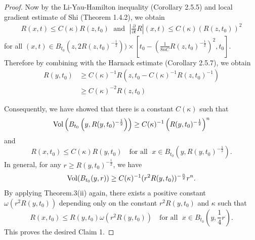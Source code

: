 \begin{proof}
Now by the Li-Yau-Hamilton inequality (Corollary 2.5.5) and local
gradient estimate of Shi (Theorem 1.4.2), we obtain
\begin{align*}
R(x,t)\leq C(\kappa)R(z,t_{0})\; \text{ and }\;
\left|\frac{\partial}{\partial t}R\right|(x,t) \leq
C(\kappa)(R(z,t_{0}))^{2}
\end{align*}
for all $ (x,t)\in
B_{t_{0}}(z,2R(z,t_{0})^{-\frac{1}{2}}))\times[t_{0}-
(\frac{1}{8nC}R(z,t_{0})^{-\frac{1}{2}})^{2},t_{0}]$. Therefore by
combining with the Harnack estimate (Corollary 2.5.7), we obtain
\begin{align*}
R(y,t_{0})&  \geq C(\kappa)^{-1}R(z,t_{0}-C(\kappa)^{-1}R(z,t_{0})^{-1})\\
&  \geq C(\kappa)^{-2} R(z,t_{0})
\end{align*}

Consequently, we have showed that there is a constant $C(\kappa)$
such that
$$
\operatorname{Vol} \left(B_{t_{0}}\left(y,R(y,t_{0})^{-\frac{1}{2}}\right)\right) \geq
C(\kappa)^{-1}\left(R(y,t_{0})^{-\frac{1}{2}}\right)^{n}
$$
and
$$
R(x,t_{0})\leq C(\kappa)R(y,t_{0}) \quad \text{for all }\; x\in
B_{t_{0}}\left(y,R(y,t_{0})^{-\frac{1}{2}}\right).
$$
In general, for any $r\geq R(y,t_{0})^{-\frac{1}{2}}$, we have
$$
\operatorname{Vol} (B_{t_{0}}(y,r)) \geq
C(\kappa)^{-1}(r^{2}R(y,t_{0}))^{-\frac{n}{2}}r^{n}.
$$
By\; applying\; Theorem.3(ii)\; again,\; there\; exists\;
a\; positive\; constant $\omega(r^{2}R(y,t_{0}))$ depending only
on the constant $r^{2}R(y,t_{0})$ and $\kappa$ such that
$$
R(x,t_{0})\leq R(y,t_{0})\omega(r^{2}R(y,t_{0}))\quad \mbox{for
all }\;  x\in B_{t_{0}}\left(y,\frac{1}{4}r\right).
$$
This proves the desired Claim 1.
\end{proof}

